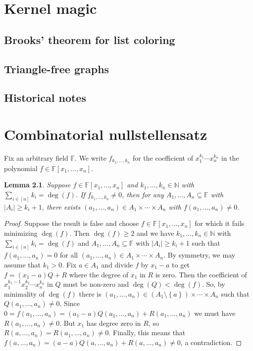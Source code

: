 \documentclass[openany]{tufte-book} %
\theoremstyle{plain}
\newtheorem{lemma}{Lemma}
\newcommand{\set}[1]{\left\{ #1 \right\}}
\newcommand{\card}[1]{\left|#1\right|}
\newcommand{\irange}[1]{\left[#1\right]}
\newcommand{\IN}{\mathbb{N}}
\begin{document}
\chapter{Kernel magic}
\section{Brooks' theorem for list coloring}
\section{Triangle-free graphs}
\section{Historical notes}

\chapter{Combinatorial nullstellensatz}
Fix an arbitrary field $\mathbb{F}$. We write $f_{k_1, \ldots, k_n}$ for the coefficient of $x_1^{k_1}\cdots x_n^{k_n}$ in the polynomial $f \in \mathbb{F}[x_1, \ldots, x_n]$. 
\begin{lemma}
Suppose $f \in \mathbb{F}[x_1, \ldots, x_n]$ and $k_1, \ldots, k_n \in \IN$ with $\sum_{i \in \irange{n}} k_i = \deg(f)$.  If $f_{k_1, \ldots, k_n} \ne 0$, then for any $A_1, \ldots, A_n \subseteq \mathbb{F}$ with $\card{A_i} \ge k_i + 1$, there exists $(a_1, \ldots, a_n) \in A_1 \times \cdots \times A_n$ with $f(a_1, \ldots, a_n) \ne 0$.
\end{lemma}
\begin{proof}
Suppose the result is false and choose $f \in \mathbb{F}[x_1, \ldots, x_n]$ for which it fails 
minimizing $\deg(f)$. Then $\deg(f) \ge 2$ and we have $k_1, \ldots, k_n \in \IN$ with $\sum_{i \in \irange{n}} k_i = \deg(f)$ and 
$A_1, \ldots, A_n \subseteq \mathbb{F}$ with $\card{A_i} \ge k_i + 1$ such that $f(a_1, \ldots, a_n) = 0$ for all $(a_1, \ldots, a_n) \in A_1 \times \cdots \times A_n$.  
By symmetry, we may assume that $k_1 > 0$.  Fix $a \in A_1$ and divide $f$ by $x_1 - a$ to get $f = (x_1 - a)Q + R$ where the degree of $x_1$ in $R$ is zero.  
Then the coefficient of $x_1^{k_1-1}x_2^{k_2} \cdots x_n^{k_n}$ in $Q$ must be non-zero and $\deg(Q) < \deg(f)$.  So, by minimality of $\deg(f)$ there 
is $(a_1, \ldots, a_n) \in (A_1 \setminus \set{a}) \times \cdots \times A_n$ such that $Q(a_1,\ldots, a_n) \ne 0$.  
Since $0 = f(a_1,\ldots, a_n) = (a_1 - a)Q(a_1,\ldots, a_n) + R(a_1,\ldots, a_n)$ we must have $R(a_1,\ldots, a_n) \ne 0$.  
But $x_1$ has degree zero in $R$, so $R(a,\ldots, a_n) = R(a_1,\ldots, a_n) \ne 0$.  
Finally, this means that $f(a,\ldots, a_n) = (a-a)Q(a,\ldots, a_n) + R(a,\ldots, a_n) \ne 0$, a contradiction.
\end{proof}
\end{document}
